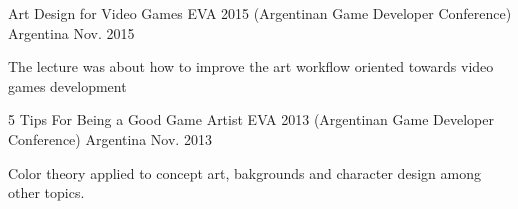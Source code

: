 

\begin{cventries}

  \cventry
    {Art Design for Video Games} %
    {EVA 2015 (Argentinan Game Developer Conference)} %
    {Argentina} %
    {Nov. 2015} %
    {
      \begin{cvitems} %
         \item {The lecture was about how to improve the art workflow oriented towards video games development}
      \end{cvitems}
    }

 \cventry
    {5 Tips For Being a Good Game Artist} %
    {EVA 2013 (Argentinan Game Developer Conference)} %
    {Argentina} %
    {Nov. 2013} %
    {
      \begin{cvitems} %
        \item {Color theory applied to concept art, bakgrounds and character design among other topics.}
      \end{cvitems}
    }

\end{cventries}
